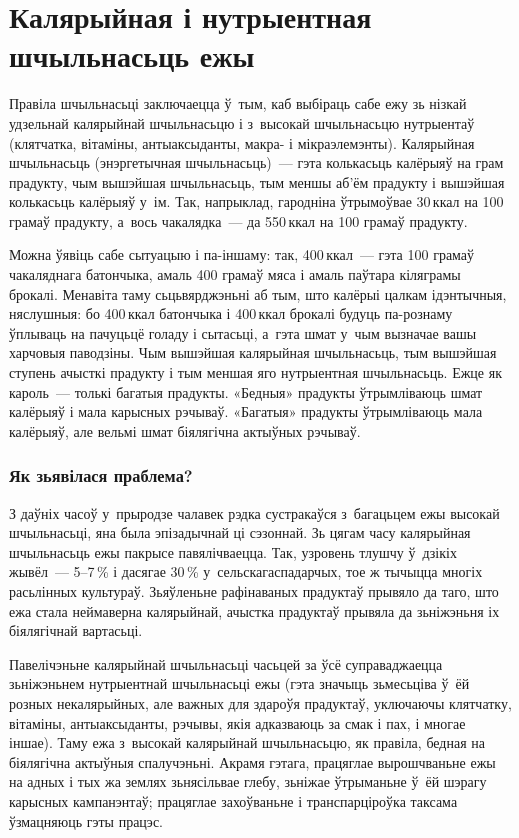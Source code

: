 
\chapter{Калярыйная і нутрыентная шчыльнасьць ежы}

Правіла шчыльнасьці заключаецца ў~тым, каб выбіраць сабе ежу зь нізкай удзельнай калярыйнай шчыльнасьцю і з~высокай шчыльнасьцю нутрыентаў (клятчатка, вітаміны, антыаксыданты, макра- і мікраэлемэнты). Калярыйная шчыльнасьць (энэргетычная шчыльнасьць)~--- гэта колькасьць калёрыяў на грам прадукту, чым вышэйшая шчыльнасьць, тым меншы аб'ём прадукту і вышэйшая колькасьць калёрыяў у~ім. Так, напрыклад, гародніна ўтрымоўвае 30\,ккал на 100 грамаў прадукту, а~вось чакалядка~--- да 550\,ккал на 100 грамаў прадукту.

Можна ўявіць сабе сытуацыю і па-іншаму: так, 400\,ккал~--- гэта 100 грамаў чакаляднага батончыка, амаль 400 грамаў мяса і амаль паўтара кіляграмы брокалі. Менавіта таму сьцьвярджэньні аб тым, што калёрыі цалкам ідэнтычныя, няслушныя: бо 400\,ккал батончыка і 400\,ккал брокалі будуць па-рознаму ўплываць на пачуцьцё голаду і сытасьці, а~гэта шмат у~чым вызначае вашы харчовыя паводзіны. Чым вышэйшая калярыйная шчыльнасьць, тым вышэйшая ступень ачысткі прадукту і тым меншая яго нутрыентная шчыльнасьць. Ежце як кароль~--- толькі багатыя прадукты. «Бедныя» прадукты ўтрымліваюць шмат калёрыяў і мала карысных рэчываў. «Багатыя» прадукты ўтрымліваюць мала калёрыяў, але вельмі шмат біялягічна актыўных рэчываў.

\subsection{Як зьявілася праблема?}

З даўніх часоў у~прыродзе чалавек рэдка сустракаўся з~багацьцем ежы высокай шчыльнасьці, яна была эпізадычнай ці сэзоннай. Зь цягам часу калярыйная шчыльнасьць ежы пакрысе павялічваецца. Так, узровень тлушчу ў~дзікіх жывёл~--- 5--7\,\% і дасягае 30\,\% у~сельскагаспадарчых, тое ж тычыцца многіх расьлінных культураў. Зьяўленьне рафінаваных прадуктаў прывяло да таго, што ежа стала неймаверна калярыйнай, ачыстка прадуктаў прывяла да зьніжэньня іх біялягічнай вартасьці.

Павелічэньне калярыйнай шчыльнасьці часьцей за ўсё суправаджаецца зьніжэньнем нутрыентнай шчыльнасьці ежы (гэта значыць зьмесьціва ў~ёй розных некалярыйных, але важных для здароўя прадуктаў, уключаючы клятчатку, вітаміны, антыаксыданты, рэчывы, якія адказваюць за смак і пах, і многае іншае). Таму ежа з~высокай калярыйнай шчыльнасьцю, як правіла, бедная на біялягічна актыўныя спалучэньні. Акрамя гэтага, працяглае вырошчваньне ежы на адных і тых жа землях зьнясільвае глебу, зьніжае ўтрыманьне ў~ёй шэрагу карысных кампанэнтаў; працяглае захоўваньне і транспарціроўка таксама ўзмацняюць гэты працэс.

